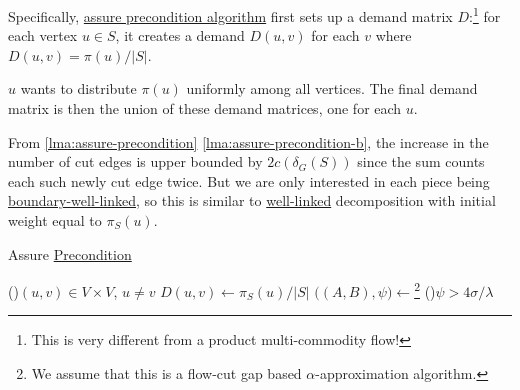 Specifically, \hyperref[algo:assure-precondition]{assure precondition algorithm} first sets up a demand matrix \(D\):\footnote{This is very different from a product multi-commodity flow!} for each vertex \(u \in S\), it creates a demand \(D(u, v)\) for each \(v\) where \(D(u, v) = \pi (u) / \lvert S \rvert \).

\begin{intuition}
	\(u\) wants to distribute \(\pi (u)\) uniformly among all vertices. The final demand matrix is then the union of these demand matrices, one for each \(u\).
\end{intuition}

From \autoref{lma:assure-precondition} \autoref{lma:assure-precondition-b}, the increase in the number of cut edges is upper bounded by \(2 c(\delta _G(S))\) since the sum counts each such newly cut edge twice. But we are only interested in each piece being \hyperref[def:boundary-well-linked]{boundary-well-linked}, so this is similar to \hyperref[def:well-linked]{well-linked} decomposition with initial weight equal to \(\pi _S(u)\).

\begin{algorithm}[H]\label{algo:assure-precondition}
	\DontPrintSemicolon{}
	\caption{Assure \hyperref[def:precondition]{Precondition}}

	\BlankLine
	\For(){\((u, v) \in V \times V\), \(u \neq v\)}{
		\(D(u, v)\gets \pi _S(u) / \lvert S \rvert \)\;
	}
	\;
	\(\big((A, B), \psi \big) \gets\)\footnote{We assume that this is a flow-cut gap based \(\alpha \)-approximation algorithm.}
	\;
	\uIf(\label{algo:assure-precondition-if}){\(\psi > 4 \sigma / \lambda \)}{
		\;
	}
\end{algorithm}

